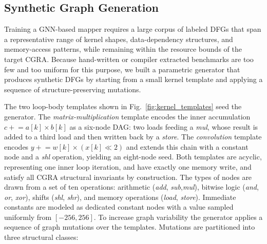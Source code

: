 \documentclass[runningheads]{llncs}
\begin{document}
\subsection{Synthetic Graph Generation}\label{subsec:synthetic_dfg_gen}
%


Training a GNN-based mapper requires a large corpus of labeled DFGs that span a representative range of kernel shapes, data-dependency structures, and memory-access patterns, while remaining within the resource bounds of the target CGRA.
%
Because hand-written or compiler extracted benchmarks are too few and too uniform for this purpose, we built a parametric generator that produces synthetic DFGs by starting from a small kernel template and applying a sequence of structure-preserving mutations.

The two loop-body templates shown in Fig.~\ref{fig:kernel_templates} seed the generator. 
The \emph{matrix-multiplication} %
template encodes the inner accumulation $c \mathrel{+}= a[k] \times b[k]$ as a six-node DAG: two loads feeding a \textit{mul}, whose result is added to a third load and then written back by a \textit{store}. The \emph{convolution} %
template encodes $y \mathrel{+}= w[k] \times (x[k] \mathrel{\ll} 2)$ and extends this chain with a constant node and a \textit{shl} operation, yielding an eight-node seed. Both templates are acyclic, representing one inner loop iteration, and have exactly one memory write, and satisfy all CGRA structural invariants by construction.
%
The types of nodes are drawn from %
a set of ten operations: arithmetic (\textit{add}, \textit{sub},\textit{mul}), bitwise logic (\textit{and}, \textit{or}, \textit{xor}), shifts (\textit{shl}, \textit{shr}), and memory operations (\textit{load}, \textit{store}). Immediate constants are modeled as dedicated constant nodes with a value sampled uniformly from $[-256, 256]$.
%
To increase graph variability %
the generator applies a sequence of graph mutations over the templates. 
Mutations are partitioned into three structural classes:
\end{document}
